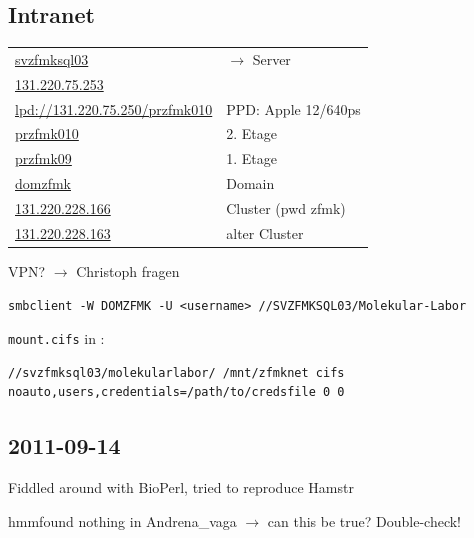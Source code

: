 \subsection*{Intranet}


\begin{tabular}[h]{l l}
	\url{svzfmksql03} & $\rightarrow$ Server \\
	\url{131.220.75.253} & ~\\
	\url{lpd://131.220.75.250/przfmk010} & PPD: Apple 12/640ps\\
	\url{przfmk010} & 2. Etage\\
	\url{przfmk09} & 1. Etage\\
	\url{domzfmk} & Domain\\
	\url{131.220.228.166} & Cluster (pwd zfmk)\\
	\url{131.220.228.163} & alter Cluster\\
\end{tabular}

VPN? $\rightarrow$ Christoph fragen

\begin{lstlisting}
smbclient -W DOMZFMK -U <username> //SVZFMKSQL03/Molekular-Labor
\end{lstlisting}

\verb|mount.cifs| in :
\begin{lstlisting}
//svzfmksql03/molekularlabor/ /mnt/zfmknet cifs noauto,users,credentials=/path/to/credsfile 0 0
\end{lstlisting}

\subsection*{2011-09-14}

Fiddled around with BioPerl, tried to reproduce Hamstr

hmmfound nothing in Andrena\_vaga $\rightarrow$ can this be true? Double-check!

